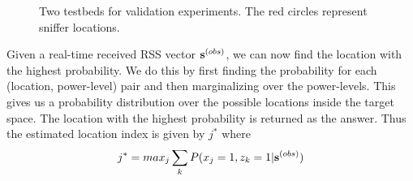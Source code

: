 \begin{figure}
	\centering
		 \quad \quad
	\caption{Two testbeds for validation experiments. The red circles represent sniffer locations.}
	\label{fig:experimenttestbed}
\end{figure}


Given a real-time received RSS vector ${\bf {s}}^{(obs)}$, we can now
find the location with the highest probability. We do this by first
finding the probability for each (location, power-level) pair and then
marginalizing over the power-levels. This gives us a probability
distribution over the possible locations inside the target space. The
location with the highest probability is returned as the answer.
Thus the estimated location index is given by $j^{*}$ where
\begin{align}
j^{*} = max_{j} \sum_{k} P({x_{j}} = 1, {z_{k}} = 1 | {\bf {s}}^{(obs)}) 
\end{align}
